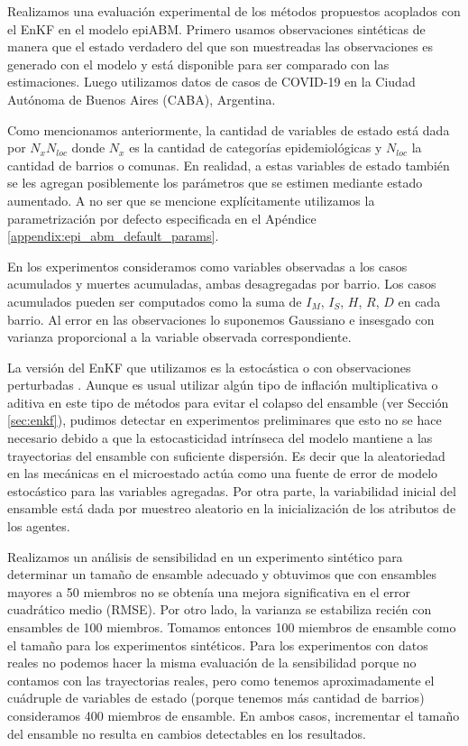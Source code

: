 Realizamos una evaluación experimental de los métodos propuestos acoplados con el EnKF en el modelo epiABM. Primero usamos observaciones sintéticas de manera que el estado verdadero del que son muestreadas las observaciones es generado con el modelo y está disponible para ser comparado con las estimaciones. Luego utilizamos datos de casos de COVID-19 en la Ciudad Autónoma de Buenos Aires (CABA), Argentina. 

Como mencionamos anteriormente, la cantidad de variables de estado está dada por $N_x N_{loc}$ donde $N_x$ es la cantidad de categorías epidemiológicas y $N_{loc}$ la cantidad de barrios o comunas. En realidad, a estas variables de estado también se les agregan posiblemente los parámetros que se estimen mediante estado aumentado. A no ser que se mencione explícitamente utilizamos la parametrización por defecto especificada en el Apéndice \ref{appendix:epi_abm_default_params}.

En los experimentos consideramos como variables observadas a los casos acumulados y muertes acumuladas, ambas desagregadas por barrio. Los casos acumulados pueden ser computados como la suma de $I_M$, $I_S$, $H$, $R$, $D$ en cada barrio. Al error en las observaciones lo suponemos Gaussiano e insesgado con varianza proporcional a la variable observada correspondiente. 

La versión del EnKF que utilizamos es la estocástica o con observaciones perturbadas \citep{Burgers1998}. Aunque es usual utilizar algún tipo de inflación multiplicativa o aditiva en este tipo de métodos para evitar el colapso del ensamble (ver Sección \ref{sec:enkf}), pudimos detectar en experimentos preliminares que esto no se hace necesario debido a que la estocasticidad intrínseca del modelo mantiene a las trayectorias del ensamble con suficiente dispersión. Es decir que la aleatoriedad en las mecánicas en el microestado actúa como una fuente de error de modelo estocástico para las variables agregadas. Por otra parte, la variabilidad inicial del ensamble está dada por muestreo aleatorio en la inicialización de los atributos de los agentes.

Realizamos un análisis de sensibilidad en un experimento sintético para determinar un tamaño de ensamble adecuado y obtuvimos que con ensambles mayores a 50 miembros no se obtenía una mejora significativa en el error cuadrático medio (RMSE). Por otro lado, la varianza se estabiliza recién con ensambles de 100 miembros. Tomamos entonces 100 miembros de ensamble como el tamaño para los experimentos sintéticos. Para los experimentos con datos reales no podemos hacer la misma evaluación de la sensibilidad porque no contamos con las trayectorias reales, pero como tenemos aproximadamente el cuádruple de variables de estado (porque tenemos más cantidad de barrios) consideramos 400 miembros de ensamble. En ambos casos, incrementar el tamaño del ensamble no resulta en cambios detectables en los resultados.


